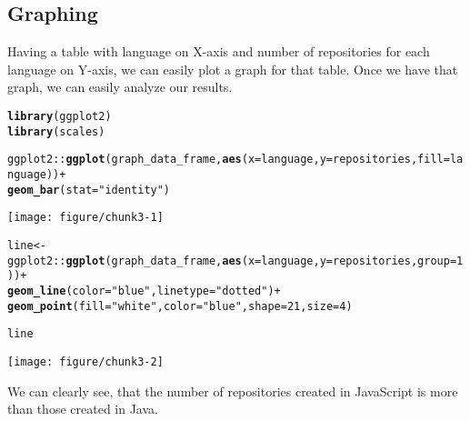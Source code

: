 \documentclass{article}\usepackage[]{graphicx}\usepackage[]{color}
\makeatletter
\def\maxwidth{ %
  \ifdim\Gin@nat@width>\linewidth
    \linewidth
  \else
    \Gin@nat@width
  \fi
}
\newcommand{\hlnum}[1]{\textcolor[rgb]{0.686,0.059,0.569}{#1}}%
\newcommand{\hlstr}[1]{\textcolor[rgb]{0.192,0.494,0.8}{#1}}%
\newcommand{\hlopt}[1]{\textcolor[rgb]{0,0,0}{#1}}%
\newcommand{\hlstd}[1]{\textcolor[rgb]{0.345,0.345,0.345}{#1}}%
\newcommand{\hlkwb}[1]{\textcolor[rgb]{0.69,0.353,0.396}{#1}}%
\newcommand{\hlkwc}[1]{\textcolor[rgb]{0.333,0.667,0.333}{#1}}%
\newcommand{\hlkwd}[1]{\textcolor[rgb]{0.737,0.353,0.396}{\textbf{#1}}}%
\newenvironment{kframe}{%
 \def\at@end@of@kframe{}%
 \ifinner\ifhmode%
  \def\at@end@of@kframe{\end{minipage}}%
  \begin{minipage}{\columnwidth}%
 \fi\fi%
 \def\FrameCommand##1{\hskip\@totalleftmargin \hskip-\fboxsep
 \colorbox{shadecolor}{##1}\hskip-\fboxsep
     \hskip-\linewidth \hskip-\@totalleftmargin \hskip\columnwidth}%
 \MakeFramed {\advance\hsize-\width
   \@totalleftmargin\z@ \linewidth\hsize
   \@setminipage}}%
 {\par\unskip\endMakeFramed%
 \at@end@of@kframe}
\newenvironment{knitrout}{}{} %
\makeatother
\begin{document}
\subsection*{Graphing}

Having a table with language on X-axis and number of repositories for each language on Y-axis, we can easily plot a graph for that table. Once we have that graph, we can easily analyze our results.

\begin{knitrout}
\color{fgcolor}\begin{kframe}
\begin{alltt}
\hlkwd{library}\hlstd{(ggplot2)}
\hlkwd{library}\hlstd{(scales)}

\hlstd{ggplot2}\hlopt{::}\hlkwd{ggplot}\hlstd{(graph_data_frame,}\hlkwd{aes}\hlstd{(}\hlkwc{x}\hlstd{=language,}\hlkwc{y}\hlstd{=repositories,}\hlkwc{fill}\hlstd{=language))}\hlopt{+}
        \hlkwd{geom_bar}\hlstd{(}\hlkwc{stat}\hlstd{=}\hlstr{"identity"}\hlstd{)}
\end{alltt}
\end{kframe}
\texttt{[image: figure/chunk3-1]} 
\begin{kframe}\begin{alltt}
\hlstd{line}\hlkwb{<-}\hlstd{ggplot2}\hlopt{::}\hlkwd{ggplot}\hlstd{(graph_data_frame,}\hlkwd{aes}\hlstd{(}\hlkwc{x}\hlstd{=language,}\hlkwc{y}\hlstd{=repositories,}\hlkwc{group}\hlstd{=}\hlnum{1}\hlstd{))}\hlopt{+}
       \hlkwd{geom_line}\hlstd{(}\hlkwc{color}\hlstd{=}\hlstr{"blue"}\hlstd{,} \hlkwc{linetype}\hlstd{=}\hlstr{"dotted"}\hlstd{)}\hlopt{+}
        \hlkwd{geom_point}\hlstd{(}\hlkwc{fill}\hlstd{=}\hlstr{"white"}\hlstd{,} \hlkwc{color}\hlstd{=}\hlstr{"blue"}\hlstd{,} \hlkwc{shape}\hlstd{=}\hlnum{21}\hlstd{,} \hlkwc{size}\hlstd{=}\hlnum{4}\hlstd{)}

\hlstd{line}
\end{alltt}
\end{kframe}
\texttt{[image: figure/chunk3-2]} 

\end{knitrout}

We can clearly see, that the number of repositories created in JavaScript is more than those created in Java.
\end{document}
